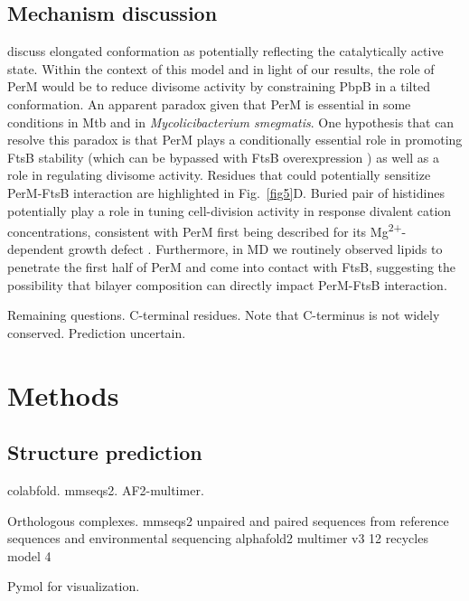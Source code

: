 \documentclass[pdflatex,sn-basic]{sn-jnl}%
\newcommand\mtb{Mtb}
\newcommand\msmegfull{\textit{Mycolicibacterium smegmatis}}
\begin{document}
\subsection{Mechanism discussion}
\citep{kashammerCryoEMStructureBacterial2023} discuss elongated conformation as potentially reflecting the catalytically active state.
Within the context of this model and in light of our results, the role of PerM would be to reduce divisome activity by constraining PbpB in a tilted conformation. 
An apparent paradox given that PerM is essential in some conditions in \mtb{} and in \msmegfull{}.
One hypothesis that can resolve this paradox is that PerM plays a conditionally essential role in promoting FtsB stability (which can be bypassed with FtsB overexpression \citep{wangPersistentMycobacteriumTuberculosis2019}) as well as a role in regulating divisome activity.
Residues that could potentially sensitize PerM-FtsB interaction are highlighted in Fig.~\ref{fig5}D.
Buried pair of histidines potentially play a role in tuning cell-division activity in response divalent cation concentrations, consistent with PerM first being described for its Mg\textsuperscript{2+}-dependent growth defect \citep{goodsmithDisruptionTuberculosisMembrane2015}.
Furthermore, in MD we routinely observed lipids to penetrate the first half of PerM and come into contact with FtsB, suggesting the possibility that bilayer composition can directly impact PerM-FtsB interaction.

Remaining questions. C-terminal residues. Note that C-terminus is not widely conserved. Prediction uncertain.




\section{Methods}

\subsection{Structure prediction}

colabfold.
mmseqs2.
AF2-multimer.

Orthologous complexes.
mmseqs2 unpaired and paired sequences from reference sequences and environmental sequencing
alphafold2 multimer v3
12 recycles
model 4

Pymol for visualization.
\end{document}
